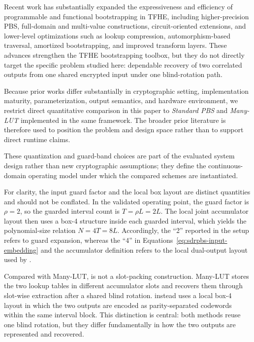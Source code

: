 Recent work has substantially expanded the expressiveness and efficiency of programmable and functional bootstrapping in TFHE, including higher-precision PBS, full-domain and multi-value constructions, circuit-oriented extensions, and lower-level optimizations such as lookup compression, automorphism-based traversal, amortized bootstrapping, and improved transform layers. These advances strengthen the TFHE bootstrapping toolbox, but they do not directly target the specific problem studied here: dependable recovery of two correlated outputs from one shared encrypted input under one blind-rotation path.

Because prior works differ substantially in cryptographic setting, implementation maturity, parameterization, output semantics, and hardware environment, we restrict direct quantitative comparison in this paper to \emph{Standard PBS} and \emph{Many-LUT} implemented in the same framework. The broader prior literature is therefore used to position the problem and design space rather than to support direct runtime claims.

These quantization and guard-band choices are part of the evaluated system design rather than new cryptographic assumptions; they define the continuous-domain operating model under which the compared schemes are instantiated.

For clarity, the input guard factor and the local \SDRPBS box layout are distinct quantities and should not be conflated. In the validated \SDRPBS operating point, the guard factor is $\rho=2$, so the guarded interval count is $T=\rho L=2L$. The local joint accumulator layout then uses a box-4 structure inside each guarded interval, which yields the polynomial-size relation $N=4T=8L$. Accordingly, the ``2'' reported in the setup refers to guard expansion, whereas the ``4'' in Equations~\eqref{eq:sdrpbs-input-embedding} and the accumulator definition refers to the local dual-output layout used by \SDRPBS.

Compared with Many-LUT, \SDRPBS is not a slot-packing construction. Many-LUT stores the two lookup tables in different accumulator slots and recovers them through slot-wise extraction after a shared blind rotation. \SDRPBS instead uses a local box-4 layout in which the two outputs are encoded as parity-separated codewords within the same interval block. This distinction is central: both methods reuse one blind rotation, but they differ fundamentally in how the two outputs are represented and recovered.

